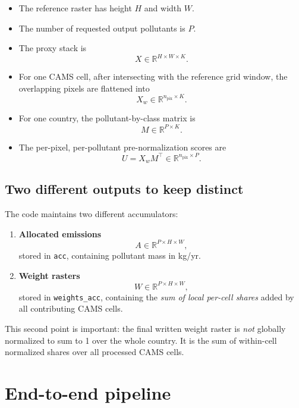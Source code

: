 \documentclass[11pt,a4paper]{article}
\newcommand{\R}{\mathbb{R}}
\begin{document}
\begin{itemize}[leftmargin=1.4em]
  \item The reference raster has height $H$ and width $W$.
  \item The number of requested output pollutants is $P$.
  \item The proxy stack is
  \[
  X \in \R^{H \times W \times K}.
  \]
  \item For one CAMS cell, after intersecting with the reference grid window, the
  overlapping pixels are flattened into
  \[
  X_w \in \R^{n_{\text{pix}} \times K}.
  \]
  \item For one country, the pollutant-by-class matrix is
  \[
  M \in \R^{P \times K}.
  \]
  \item The per-pixel, per-pollutant pre-normalization scores are
  \[
  U = X_w M^\top \in \R^{n_{\text{pix}} \times P}.
  \]
\end{itemize}

\subsection{Two different outputs to keep distinct}

The code maintains two different accumulators:

\begin{enumerate}[leftmargin=1.4em]
  \item \textbf{Allocated emissions}
  \[
  A \in \R^{P \times H \times W},
  \]
  stored in \texttt{acc}, containing pollutant mass in kg/yr.

  \item \textbf{Weight rasters}
  \[
  W \in \R^{P \times H \times W},
  \]
  stored in \texttt{weights\_acc}, containing the \emph{sum of local per-cell
  shares} added by all contributing CAMS cells.
\end{enumerate}

This second point is important: the final written weight raster is \emph{not}
globally normalized to sum to 1 over the whole country. It is the sum of
within-cell normalized shares over all processed CAMS cells.

\section{End-to-end pipeline}
\end{document}
